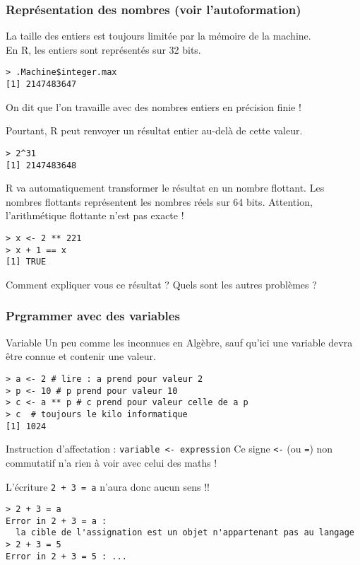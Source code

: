 \documentclass[10pt]{beamer}
\begin{document}
\begin{frame}[fragile]
  \frametitle{Représentation des nombres (voir l'autoformation)}
  \alert{La taille} des entiers \alert{est toujours limitée par} la mémoire de \alert{la machine}. \\
  En R, les entiers sont représentés sur 32 bits.
\begin{lstlisting}
> .Machine$integer.max
[1] 2147483647
\end{lstlisting}
On dit que l'on travaille avec des nombres entiers en \alert{précision finie} !

Pourtant, R peut renvoyer un résultat entier au-delà de cette valeur.
\begin{lstlisting}
> 2^31
[1] 2147483648
\end{lstlisting}
R va automatiquement transformer le résultat en un \alert{nombre flottant}.
Les nombres flottants représentent les nombres réels sur 64 bits.
Attention, l’arithmétique flottante n’est pas exacte !
\begin{lstlisting}
> x <- 2 ** 221
> x + 1 == x
[1] TRUE  
\end{lstlisting}
 Comment expliquer vous ce résultat ? Quels sont les autres problèmes ?
\end{frame}



\begin{frame}[fragile]
  \frametitle{Prgrammer avec des variables}
  \begin{alertblock}{Variable}
    Un peu comme les \alert{inconnues} en Algèbre, sauf qu'ici une variable devra être \alert{connue} et contenir une valeur.
  \end{alertblock}
      \begin{lstlisting}
> a <- 2 # lire : a prend pour valeur 2
> p <- 10 # p prend pour valeur 10
> c <- a ** p # c prend pour valeur celle de a p
> c  # toujours le kilo informatique
[1] 1024 
\end{lstlisting}

\begin{alertblock}{Instruction d'affectation : \texttt{variable <- expression}}
  Ce signe \texttt{<-} (ou \texttt{=}) non commutatif n'a rien à voir avec celui des maths !
\end{alertblock}

\begin{exampleblock}{  L'écriture \texttt{2 + 3 = a} n'aura donc aucun sens !!}
\begin{lstlisting}[style=block]
> 2 + 3 = a
Error in 2 + 3 = a : 
  la cible de l'assignation est un objet n'appartenant pas au langage
> 2 + 3 = 5
Error in 2 + 3 = 5 : ...
\end{lstlisting}
\end{exampleblock}
\end{frame}
\end{document}
